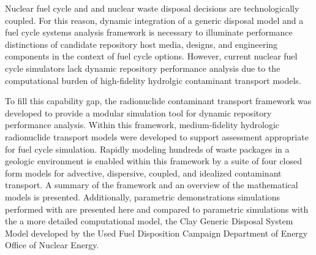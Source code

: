 

Nuclear fuel cycle and and nuclear waste disposal decisions are
technologically coupled. For this reason, dynamic
integration of a generic disposal model and a fuel cycle systems analysis
framework is necessary to illuminate performance distinctions of candidate
repository host media, designs, and engineering components in the context of
fuel cycle options. However, current nuclear fuel cycle simulators lack dynamic
repository performance analysis due to the computational burden of
high-fidelity hydrolgic contaminant transport models.

To fill this capability gap, the \Cyder radionuclide contaminant transport
framework was developed to provide a modular simulation tool for dynamic
repository performance
analysis.  Within this framework, medium-fidelity hydrologic radionuclide
transport models were developed to support assessment appropriate for fuel
cycle simulation. Rapidly modeling hundreds of waste packages in a geologic
environment is enabled within this framework by a suite of four closed form
models for advective, dispersive, coupled, and idealized contaminant transport.
A summary of the framework and an overview of the mathematical models is
presented. Additionally, parametric demonstrations simulations performed with
\Cyder are presented here and compared to parametric simulations with the
a more detailed computational model, the Clay Generic Disposal System Model
developed by the Used Fuel Disposition Campaign Department of Energy Office of
Nuclear Energy.
